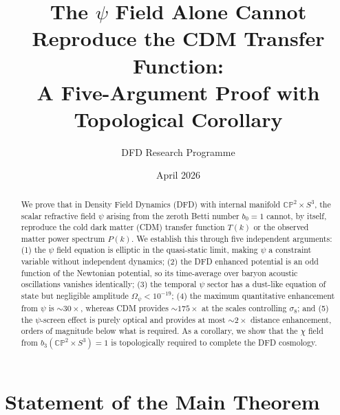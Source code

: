 \documentclass[12pt,a4paper]{article}
\title{The $\psi$ Field Alone Cannot Reproduce the CDM Transfer Function:\\
A Five-Argument Proof with Topological Corollary}
\author{DFD Research Programme}
\date{April 2026}
\newcommand{\CP}{\mathbb{CP}}
\newcommand{\Sph}{S}
\begin{document}
\maketitle

\begin{abstract}
We prove that in Density Field Dynamics (DFD) with internal manifold
$\CP^2 \times \Sph^3$, the scalar refractive field $\psi$ arising from
the zeroth Betti number $b_0 = 1$ cannot, by itself, reproduce the
cold dark matter (CDM) transfer function $T(k)$ or the observed matter
power spectrum $P(k)$. We establish this through five independent
arguments: (1) the $\psi$ field equation is elliptic in the quasi-static
limit, making $\psi$ a constraint variable without independent dynamics;
(2) the DFD enhanced potential is an odd function of the Newtonian
potential, so its time-average over baryon acoustic oscillations
vanishes identically; (3) the temporal $\psi$ sector has a dust-like
equation of state but negligible amplitude $\Omega_\psi < 10^{-19}$;
(4) the maximum quantitative enhancement from $\psi$ is $\sim 30\times$,
whereas CDM provides $\sim 175\times$ at the scales controlling
$\sigma_8$; and (5) the $\psi$-screen effect is purely optical and
provides at most $\sim 2\times$ distance enhancement, orders of
magnitude below what is required. As a corollary, we show that the
$\chi$ field from $b_3(\CP^2 \times \Sph^3) = 1$ is topologically
required to complete the DFD cosmology.
\end{abstract}

\tableofcontents
\newpage

\section{Statement of the Main Theorem}
\label{sec:theorem}
\end{document}
